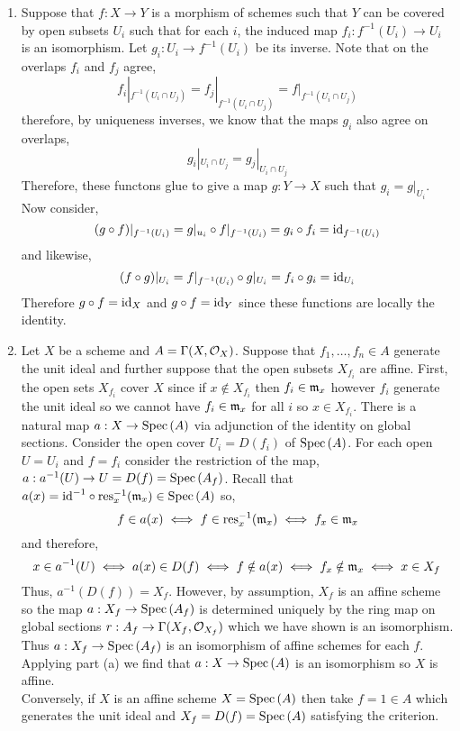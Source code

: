 \documentclass[12pt]{article}
\begin{document}
\begin{enumerate}
\item Suppose that $f : X \to Y$ is a morphism of schemes such that $Y$ can be covered by open subsets $U_i$ such that for each $i$, the induced map $f_i : f^{-1}(U_i) \to U_i$ is an isomorphism. Let $g_i : U_i \to f^{-1}(U_i)$ be its inverse. Note that on the overlaps $f_i$ and $f_j$ agree,
\[ f_i |_{f^{-1}(U_i \cap U_j)} = f_j |_{f^{-1}(U_i \cap U_j)} = f |_{f^{-1}(U_i \cap U_j)}  \]
therefore, by uniqueness inverses, we know that the maps $g_i$ also agree on overlaps,
\[ g_i |_{U_i \cap U_j} = g_j |_{U_i \cap U_j} \]
Therefore, these functons glue to give a map $g : Y \to X$ such that $g_i = g |_{U_i}$. Now consider,
\[ (g \circ f)|_{f^{-1}(U_i)} = g |_{u_i} \circ f |_{f^{-1}(U_i)} = g_i \circ f_i = \mathrm{id}_{f^{-1}(U_i)} \]
and likewise,
\[ (f \circ g)|_{U_i} = f|_{f^{-1}(U_i)} \circ g|_{U_i} = f_i \circ g_i = \mathrm{id}_{U_i} \]
Therefore $g \circ f = \mathrm{id}_X$ and $g \circ f = \mathrm{id}_Y$ since these functions are locally the identity.

\item Let $X$ be a scheme and $A = \Gamma(X, \mathcal{O}_{X})$. Suppose that $f_1, \dots, f_n \in A$ generate the unit ideal and further suppose that the open subsets $X_{f_i}$ are affine. First, the open sets $X_{f_i}$ cover $X$ since if $x \notin X_{f_i}$ then $f_i \in \mathfrak{m}_x$ however $f_i$ generate the unit ideal so we cannot have $f_i \in \mathfrak{m}_x$ for all $i$ so $x \in X_{f_i}$. There is a natural map $a : X \to \mathrm{Spec}\left( A \right)$ via adjunction of the identity on global sections. Consider the open cover $U_i = D(f_i)$ of $\mathrm{Spec}\left( A \right)$. For each open $U = U_i$ and $f = f_i$ consider the restriction of the map, $a : a^{-1}(U) \to U = D(f) = \mathrm{Spec}\left( A_{f} \right)$. Recall that $a(x) = \mathrm{id}^{-1} \circ \mathrm{res}^{-1}_x(\mathfrak{m}_x) \in \mathrm{Spec}\left( A \right)$ so,
\[ f \in a(x) \iff f \in \mathrm{res}^{-1}_x(\mathfrak{m}_x) \iff f_x \in \mathfrak{m}_x \]
and therefore,
\[ x \in a^{-1}(U) \iff a(x) \in D(f) \iff f \notin a(x) \iff f_x \notin \mathfrak{m}_x \iff x \in X_f \]
Thus, $a^{-1}(D(f)) = X_f$. However, by assumption, $X_{f}$ is an affine scheme so the map $a : X_{f} \to \mathrm{Spec}\left( A_{f} \right)$ is determined uniquely by the ring map on global sections $r : A_f \to \Gamma(X_f, \mathcal{O}_{X_f})$ which we have shown is an isomorphism. Thus $a : X_{f} \to \mathrm{Spec}\left( A_{f} \right)$ is an isomorphism of affine schemes for each $f$. Applying part (a) we find that $a : X \to \mathrm{Spec}\left( A \right)$ is an isomorphism so $X$ is affine.
\bigskip\\
Conversely, if $X$ is an affine scheme $X = \mathrm{Spec}\left( A \right)$ then take $f = 1 \in A$ which generates the unit ideal and $X_f = D(f) = \mathrm{Spec}\left( A \right)$ satisfying the criterion.
\end{enumerate}
\end{document}
